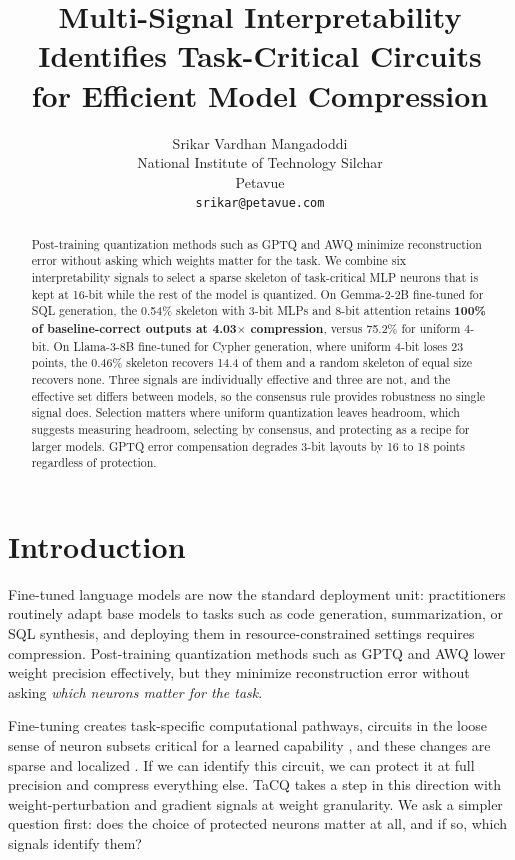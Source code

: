 \documentclass[11pt]{article}
\title{Multi-Signal Interpretability Identifies Task-Critical Circuits\\for Efficient Model Compression}
\author{Srikar Vardhan Mangadoddi \\
    National Institute of Technology Silchar \\
    Petavue \\
    \texttt{srikar@petavue.com}}
\begin{document}
\maketitle

\begin{abstract}
Post-training quantization methods such as GPTQ and AWQ minimize 
reconstruction error without asking which weights matter for the 
task. We combine six interpretability signals to select a sparse 
skeleton of task-critical MLP neurons that is kept at 16-bit while 
the rest of the model is quantized. On Gemma-2-2B fine-tuned for 
SQL generation, the 0.54\% skeleton with 3-bit MLPs and 8-bit 
attention retains \textbf{100\% of baseline-correct outputs at 
4.03$\times$ compression}, versus 75.2\% for uniform 4-bit. On 
Llama-3-8B fine-tuned for Cypher generation, where uniform 4-bit 
loses 23 points, the 0.46\% skeleton recovers 14.4 of them and a 
random skeleton of equal size recovers none. Three signals are 
individually effective and three are not, and the effective set 
differs between models, so the consensus rule provides robustness 
no single signal does. Selection matters where uniform 
quantization leaves headroom, which suggests measuring headroom, 
selecting by consensus, and protecting as a recipe for larger 
models. GPTQ error compensation degrades 3-bit layouts by 16 to 
18 points regardless of protection.
\end{abstract}

\section{Introduction}
Fine-tuned language models are now the standard deployment 
unit: practitioners routinely adapt base models to tasks such as 
code generation, summarization, or SQL synthesis, and deploying 
them in resource-constrained settings requires compression. 
Post-training quantization methods such as GPTQ 
\cite{frantar2023gptqaccurateposttrainingquantization} and AWQ 
\cite{lin2024awqactivationawareweightquantization} lower weight 
precision effectively, but they minimize reconstruction error 
without asking \emph{which neurons matter for the task}.

Fine-tuning creates task-specific computational pathways, 
circuits in the loose sense of neuron subsets critical for a 
learned capability \cite{olah2020zoom,elhage2021mathematical}, 
and these changes are sparse and localized 
\cite{panigrahi2023taskspecificskilllocalizationfinetuned,
prakash2024finetuningenhancesexistingmechanisms}. If we can 
identify this circuit, we can protect it at full precision and 
compress everything else. TaCQ 
\cite{xiao2025taskcircuitquantizationleveragingknowledge} takes 
a step in this direction with weight-perturbation and gradient 
signals at weight granularity. We ask a simpler question first: 
does the choice of protected neurons matter at all, and if so, 
which signals identify them?
\end{document}
